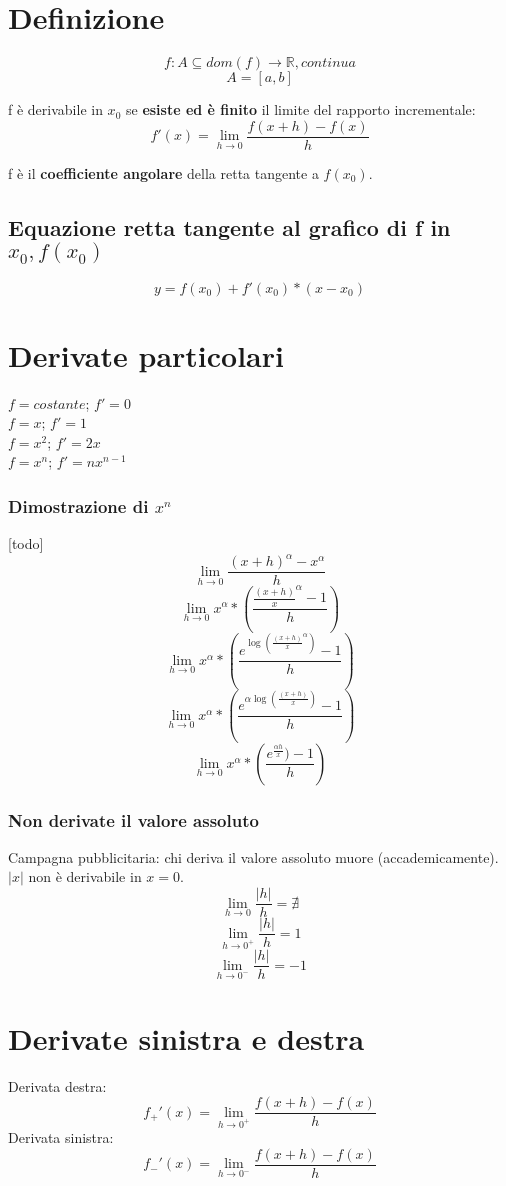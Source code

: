 \documentclass{article}
\begin{document}
\section{Definizione}

\[f : A \subseteq dom(f) \to \mathbb{R}, continua\]
\[A = [a, b]\]

f è derivabile in \(x_0\) se \textbf{esiste ed è finito} il limite del rapporto incrementale:
\[f'(x) = \lim_{h \to 0}\frac{f(x+h) - f(x)}{h}\]

f è il \textbf{coefficiente angolare} della retta tangente a \(f(x_0)\).

\subsection{Equazione retta tangente al grafico di f in \(x_0, f(x_0)\)}
\[y = f(x_0) + f'(x_0) * (x - x_0)\]

\section{Derivate particolari}
\(f = costante\); \(f' = 0\)\\
\(f = x\); \(f' = 1\)\\
\(f = x^2\); \(f' = 2x\)\\
\(f = x^n\); \(f' = nx^{n-1}\)\\

\subsubsection{Dimostrazione di \(x^n\)}
[todo]
\[\lim_{h \to 0} \frac{(x+h)^\alpha - x^\alpha}{h}\]
\[\lim_{h \to 0} x^\alpha * (\frac{\frac{(x+h)}{x}^\alpha - 1}{h})\]
\[\lim_{h \to 0} x^\alpha * (\frac{e^{\log(\frac{(x+h)}{x}^\alpha)} - 1}{h})\]
\[\lim_{h \to 0} x^\alpha * (\frac{e^{\alpha \log(\frac{(x+h)}{x})} - 1}{h})\]
\[\lim_{h \to 0} x^\alpha * (\frac{e^\frac{\alpha h}{x}) - 1}{h})\]

\subsubsection{Non derivate il valore assoluto}
Campagna pubblicitaria: chi deriva il valore assoluto muore (accademicamente).
\(|x|\) non è derivabile in \(x = 0\).
\[\lim_{h \to 0} \frac{|h|}{h} = \nexists\]
\[\lim_{h \to 0^+} \frac{|h|}{h} = 1\]
\[\lim_{h \to 0^-} \frac{|h|}{h} = -1\]

\section{Derivate sinistra e destra}
Derivata destra:
\[f_+'(x) = \lim_{h \to 0^+}\frac{f(x+h) - f(x)}{h}\]
Derivata sinistra:
\[f_-'(x) = \lim_{h \to 0^-}\frac{f(x+h) - f(x)}{h}\]
\end{document}
